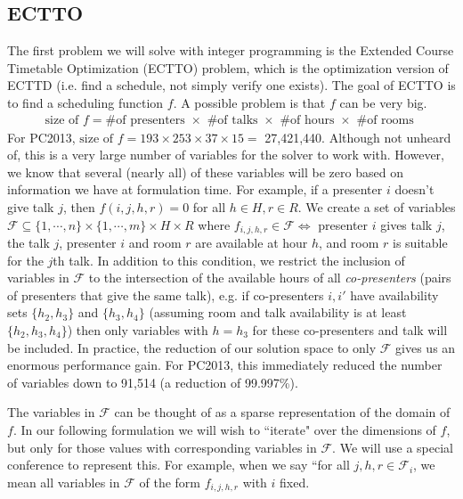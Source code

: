 \documentclass{svjour3}                     %
\begin{document}
\subsection{ECTTO}
The first problem we will solve with integer programming is the Extended Course Timetable Optimization (ECTTO) problem, which is the optimization version of ECTTD (i.e. find a schedule, not simply verify one exists). The goal of ECTTO is to find a scheduling function $f$. A possible problem is that $f$ can be very big.
\begin{gather*}
	\text{size of } f = \text{\# of presenters } \times \text{ \# of talks } \times \text{ \# of hours } \times \text{ \# of rooms }
\end{gather*}
For PC2013, $\text{size of } f = 193 \times 253 \times 37 \times 15 = $ 27,421,440. Although not unheard of, this is a very large number of variables for the solver to work with. However, we know that several (nearly all) of these variables will be zero based on information we have at formulation time. For example, if a presenter $i$ doesn't give talk $j$, then $f(i,j,h,r) = 0$ for all $h \in H, r \in R$. We create a set of variables $\mathcal F \subseteq \{1,\cdots,n\} \times \{1,\cdots,m\} \times H \times R$ where $f_{i,j,h,r} \in \mathcal F \iff $ presenter $i$ gives talk $j$, the talk $j$, presenter $i$ and room $r$ are available at hour $h$, and room $r$ is suitable for the $j$th talk. In addition to this condition, we restrict the inclusion of variables in $\mathcal F$ to the intersection of the available hours of all \emph{co-presenters} (pairs of presenters that give the same talk), e.g. if co-presenters $i,i'$ have availability sets $\{h_2,h_3\}$ and $\{h_3,h_4\}$ (assuming room and talk availability is at least $\{h_2, h_3, h_4\}$) then only variables with $h=h_3$ for these co-presenters and talk will be included. In practice, the reduction of our solution space to only $\mathcal F$ gives us an enormous performance gain. For PC2013, this immediately reduced the number of variables down to 91,514 (a reduction of 99.997\%).

The variables in $\mathcal F$ can be thought of as a sparse representation of the domain of $f$. In our following formulation we will wish to ``iterate" over the dimensions of $f$, but only for those values with corresponding variables in $\mathcal F$. We will use a special conference to represent this. For example, when we say ``for all $j,h,r \in \mathcal F_i$, we mean all variables in $\mathcal F$ of the form $f_{i,j,h,r}$ with $i$ fixed.
\end{document}
